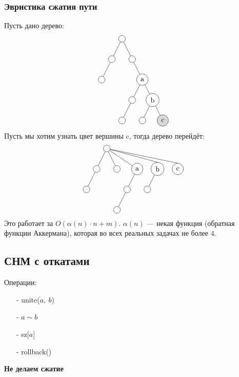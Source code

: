 \documentclass[12pt, a4paper]{article}
\begin{document}
    \subsubsection*{Эвристика сжатия пути}
    Пусть дано дерево:
    \[\begin{tikzpicture}[every circle node/.style={draw}]
        \draw (0, 0) node(0)[circle]{};
        \draw (-0.5, -1) node(1)[circle]{};
        \draw (-1, -2) node(2)[circle]{};
        \draw (0) -- (1);
        \draw (1) -- (2);
        \draw (0.5, -1) node(3)[circle]{};
        \draw (0) -- (3);
        \draw (1, -2) node(4)[circle]{a};
        \draw (0, -4) node(9)[circle]{};
        \draw (3) -- (4);
        \draw (1.5, -3) node(5)[circle]{b};
        \draw(4) -- (5);
        \draw (0.5, -3) node(6)[circle]{};
        \draw (6) -- (9);
        \draw (4) -- (6);
        \draw (1, -4) node(7)[circle]{};
        \draw (2, -4) node(8)[circle, fill=gray!30]{c};
        \draw (5) -- (7);
        \draw (5) -- (8);
    \end{tikzpicture}\]
    Пусть мы хотим узнать цвет вершины c, тогда дерево перейдёт:
    \[\begin{tikzpicture}[every circle node/.style={draw}]
        \draw (0, 0) node(0)[circle]{};
        \draw (-0.5, -1) node(1)[circle]{};
        \draw (-1, -2) node(2)[circle]{};
        \draw (0) -- (1);
        \draw (1) -- (2);
        \draw (0.5, -1) node(3)[circle]{};
        \draw (0) -- (3);
        \draw (1.5, -1) node(4)[circle]{a};
        \draw (0.5, -3) node(9)[circle]{};
        \draw (0) -- (4);
        \draw (2.5, -1) node(5)[circle]{b};
        \draw (0) to[] (5.north);
        \draw (1, -2) node(6)[circle]{};
        \draw (4) -- (6);
        \draw (6) -- (9);
        \draw (2, -2) node(7)[circle]{};
        \draw (3.5, -1) node(8)[circle]{c};
        \draw (5) -- (7);
        \draw (0) to[] (8.north);
    \end{tikzpicture}\]
    Это  работает за $O(\alpha(n)\cdot n + m)$. $\alpha(n)$ --- некая функция (обратная функции Аккермана), которая во всех реальных задачах не более $4$.
    \subsection*{СНМ с откатами}
    Операции:
    \begin{itemize}
        \item[-] unite($a,\ b$)
        \item[-] $a\sim b$
        \item[-] sz[$a$]
        \item[-] rollback()
    \end{itemize}
    \textbf{Не делаем сжатие}
\end{document}
